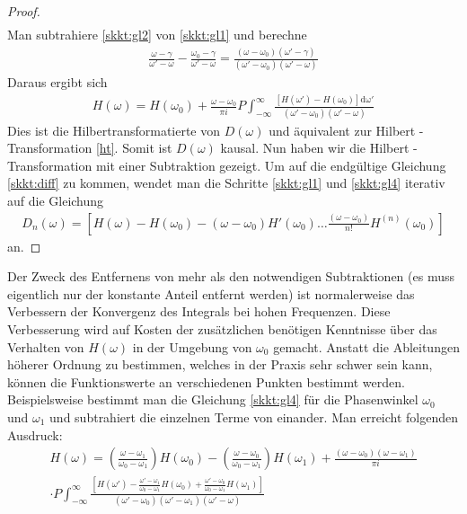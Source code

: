 \begin{satz}
\begin{proof}
\begin{align}
	\end{align}
	Man subtrahiere \ref{skkt:gl2} von \ref{skkt:gl1} und berechne 
	\begin{align}
		\frac{\omega-\gamma}{\omega' - \omega} - \frac{\omega_0 - \gamma}{\omega' - \omega} = \frac{(\omega - \omega_0)(\omega' - \gamma)}{(\omega' - \omega_0)(\omega' - \omega)}\label{skkt:gl3}
	\end{align}
	Daraus ergibt sich 
	\begin{align}
		H(\omega) = H(\omega_0) + \frac{\omega - \omega_0}{\pi i}  P \int_{-\infty}^{\infty} \frac{\left[H(\omega') - H(\omega_0) \right]\mathrm{d\omega'}}{(\omega'-\omega_0)(\omega'-\omega)}\label{skkt:gl4}
	\end{align}
	Dies ist die Hilbertransformatierte von $D(\omega)$ und äquivalent zur Hilbert - Transformation \ref{ht}. Somit ist $D(\omega)$ kausal.
	Nun haben wir die Hilbert - Transformation mit einer Subtraktion gezeigt. Um auf die endgültige Gleichung \ref{skkt:diff} zu kommen, wendet man die Schritte \ref{skkt:gl1} und \ref{skkt:gl4} iterativ auf die Gleichung 
	\begin{align}
		D_n(\omega) = \left[H(\omega) - H(\omega_0) - (\omega - \omega_0)H'(\omega_0) \hdots \frac{(\omega - \omega_0)}{n!} H^{(n)}(\omega_0)   \right]
	\end{align}
	an. 
\end{proof}
\end{satz}
Der Zweck des Entfernens von mehr als den notwendigen Subtraktionen (es muss eigentlich nur der konstante Anteil entfernt werden) ist normalerweise das Verbessern der Konvergenz des Integrals bei hohen Frequenzen. Diese Verbesserung wird auf Kosten der zusätzlichen benötigen Kenntnisse über das Verhalten von $H(\omega)$ in der Umgebung von $\omega_0$ gemacht. Anstatt die Ableitungen höherer Ordnung zu bestimmen, welches in der Praxis sehr schwer sein kann, können die Funktionswerte an verschiedenen Punkten bestimmt werden. 
Beispielsweise bestimmt man die Gleichung \ref{skkt:gl4} für die Phasenwinkel $\omega_0$ und $\omega_1$ und subtrahiert die einzelnen Terme von einander. Man erreicht folgenden Ausdruck:
\begin{align}
	H(\omega) = \left(\frac{\omega - \omega_1}{\omega_0 - \omega_1} \right) H(\omega_0) - \left(\frac{\omega - \omega_0}{\omega_0 - \omega_1} \right) H(\omega_1) +\frac{(\omega - \omega_0)(\omega-\omega_1)}{\pi i} \\
	\cdot P \int_{-\infty}^{\infty} \frac{\left[H(\omega') - \frac{\omega' - \omega_1}{\omega_0 - \omega_1} H(\omega_0) + \frac{\omega' - \omega_0}{\omega_0 - \omega_1} H(\omega_1)\right]}{(\omega' - \omega_0)(\omega' - \omega_1)(\omega' - \omega)}
\end{align} 
